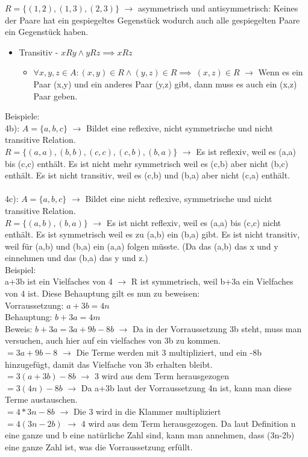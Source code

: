 \documentclass{article}
\begin{document}
	 $R=\{(1,2),(1,3),(2,3)\}$ $\to$ asymmetrisch und antisymmetrisch: Keines der Paare hat ein gespiegeltes Gegenstück wodurch auch alle gespiegelten Paare ein Gegenstück haben.
	 \begin{itemize}
	 	\item{Transitiv - $xRy \land yRz \implies xRz$}
	 	\begin{itemize}
	 		\item{$\forall x,y,z\in A:(x,y)\in R \land (y,z)\in R \implies\ (x,z) \in R$ $\to$ Wenn es ein Paar (x,y) und ein anderes Paar (y,z) gibt, dann muss es auch ein (x,z) Paar geben.}
	 	\end{itemize}
	 \end{itemize}
	 Beispiele: \\
	 4b): $A=\{a,b,c\}$ $\to$ Bildet eine reflexive, nicht symmetrische und nicht transitive Relation. \\
	 $R=\{(a,a),(b,b),(c,c),(c,b),(b,a)\}$ $\to$ Es ist reflexiv, weil es (a,a) bis (c,c) enthält. Es ist nicht mehr symmetrisch weil es (c,b) aber nicht (b,c) enthält. Es ist nicht transitiv, weil es (c,b) und (b,a) aber nicht (c,a) enthält. \\ \\
	 4c): $A=\{a,b,c\}$ $\to$ Bildet eine nicht reflexive, symmetrische und nicht transitive Relation. \\
	 $R=\{(a,b),(b,a)\}$ $\to$ Es ist nicht reflexiv, weil es (a,a) bis (c,c) nicht enthält. Es ist symmetrisch weil es zu (a,b) ein (b,a) gibt. Es ist nicht transitiv, weil für (a,b) und (b,a) ein (a,a) folgen müsste. (Da das (a,b) das x und y einnehmen und das (b,a) das y und z.) \\

	 Beispiel: \\
	 a+3b ist ein Vielfaches von 4 $\to$ R ist symmetrisch, weil b+3a ein Vielfaches von 4 ist. Diese Behauptung gilt es nun zu beweisen: \\
	 Vorraussetzung: $a+3b=4n$ \\
	 Behauptung: $b+3a=4m$ \\
	 Beweis: $b+3a=3a+9b-8b$ $\to$ Da in der Vorraussetzung 3b steht, muss man versuchen, auch hier auf ein vielfaches von 3b zu kommen. \\
	 $=3a+9b-8$ $\to$ Die Terme werden mit 3 multipliziert, und ein -8b hinzugefügt, damit das Vielfache von 3b erhalten bleibt. \\
	 $=3(a+3b)-8b$ $\to$ 3 wird aus dem Term herausgezogen \\
	 $=3(4n)-8b$ $\to$ Da a+3b laut der Vorraussetzung 4n ist, kann man diese Terme austauschen. \\
	 $=4*3n-8b$ $\to$ Die 3 wird in die Klammer multipliziert \\
	 $=4(3n-2b)$ $\to$ 4 wird  aus dem Term herausgezogen. Da laut Definition n eine ganze und b eine natürliche Zahl sind, kann man annehmen, dass (3n-2b) eine ganze Zahl ist, was die Vorraussetzung erfüllt.
\end{document}
